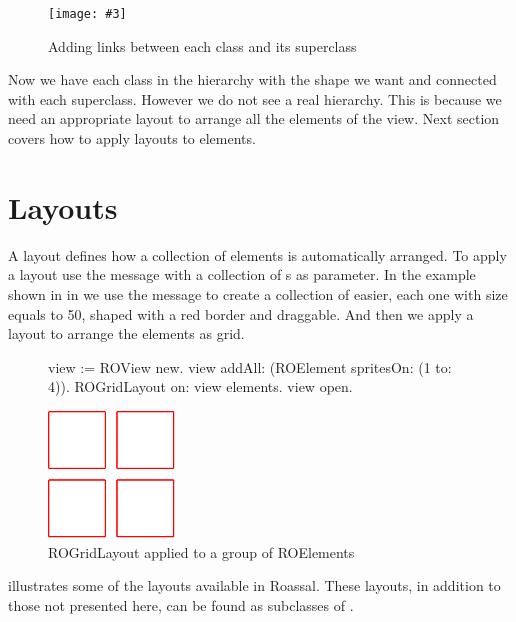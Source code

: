 \documentclass[a4paper,10pt,twoside]{book}
\newcommand{\fig}[4]{
		\begin{figure}[#1]
			\centering
			\texttt{[image: \#3]}
			\caption{\label{fig:#3}#4}
		\end{figure}}
\begin{document}
\fig{H}{0.6}{hier3}{Adding links between each class and its superclass}

Now we have each class in the  hierarchy with the shape we want and connected with each superclass. However we do not see a real hierarchy. This is because we need an appropriate layout to arrange all the elements of the view. Next section covers how to apply layouts to elements.


\section{Layouts} 
A layout defines how a collection of elements is automatically arranged. To apply a layout use the  message with a collection of s as parameter. In the example shown in in  we use the  message to create a collection of  easier, each one with size equals to 50, shaped with a red border and draggable. And then we apply a layout to arrange the elements as grid.


\begin{figure}[H]
\label{fig:primerLayout}
      \begin{minipage}[t]{0.55\textwidth}
      \vspace{0pt}
     \begin{code}{}
view := ROView new.
view addAll: (ROElement spritesOn: (1 to: 4)).
ROGridLayout on: view elements.
view open.
  \end{code}
   \end{minipage}
   \hfill
   \begin{minipage}[t]{0.6\textwidth}
      \vspace{0pt} \raggedright
       \centering
		\includegraphics[width=0.3\textwidth]{ROGrid2} %
   \end{minipage}

\caption{ROGridLayout applied to a group of ROElements}
\end{figure} 

 illustrates some of the layouts available in Roassal. These layouts, in addition to those not presented here, can be found as subclasses of .
\end{document}
